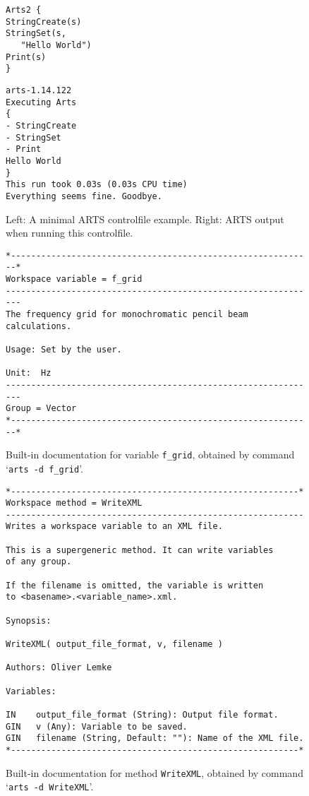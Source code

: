 \begin{figure}
\begin{minipage}[t]{0.35\hsize}
\begin{lstlisting}
Arts2 {
StringCreate(s)
StringSet(s,
   "Hello World")
Print(s)
}
\end{lstlisting}
\end{minipage}
\hspace*{\fill}
\begin{minipage}[t]{0.6\hsize}
\begin{lstlisting}
arts-1.14.122
Executing Arts
{
- StringCreate
- StringSet
- Print
Hello World
}
This run took 0.03s (0.03s CPU time)
Everything seems fine. Goodbye.
\end{lstlisting}
\end{minipage}
\caption{Left: A minimal ARTS controlfile example. Right: ARTS output
  when running this controlfile. } 
\label{fig:hello}
\end{figure}


\begin{figure}
\begin{lstlisting}
*------------------------------------------------------------*
Workspace variable = f_grid
--------------------------------------------------------------
The frequency grid for monochromatic pencil beam calculations.

Usage: Set by the user.
 
Unit:  Hz
--------------------------------------------------------------
Group = Vector
*------------------------------------------------------------*
\end{lstlisting}
\caption{Built-in documentation for variable \texttt{f\_grid}, obtained by
  command `\texttt{arts -d f\_grid}'.}
\label{fig:f_grid}
\end{figure}


\begin{figure}
\begin{lstlisting}
*---------------------------------------------------------*
Workspace method = WriteXML
-----------------------------------------------------------
Writes a workspace variable to an XML file.

This is a supergeneric method. It can write variables 
of any group.

If the filename is omitted, the variable is written
to <basename>.<variable_name>.xml.

Synopsis:

WriteXML( output_file_format, v, filename )

Authors: Oliver Lemke

Variables:

IN    output_file_format (String): Output file format.
GIN   v (Any): Variable to be saved.
GIN   filename (String, Default: ""): Name of the XML file.
*---------------------------------------------------------*
\end{lstlisting}
\caption{Built-in documentation for method \texttt{WriteXML}, obtained by
  command `\texttt{arts -d WriteXML}'.}
\label{fig:WriteXML}
\end{figure}



